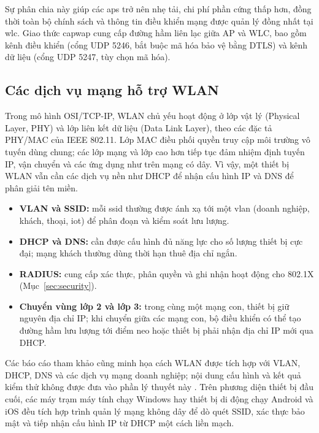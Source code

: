 Sự phân chia này giúp các \acp{ap} trở nên nhẹ tải, chi phí phần cứng thấp hơn, đồng thời toàn bộ chính sách và thông tin điều khiển mạng được quản lý đồng nhất tại \ac{wlc}. Giao thức \ac{capwap} \cite{rfc5415, rfc5416} cung cấp đường hầm liên lạc giữa AP và WLC, bao gồm kênh điều khiển (cổng UDP 5246, bắt buộc mã hóa bảo vệ bằng DTLS) và kênh dữ liệu (cổng UDP 5247, tùy chọn mã hóa).

\subsection{Các dịch vụ mạng hỗ trợ WLAN}

Trong mô hình OSI/TCP-IP, WLAN chủ yếu hoạt động ở lớp vật lý (Physical Layer,
PHY) và lớp liên kết dữ liệu (Data Link Layer), theo các đặc tả PHY/MAC của
IEEE 802.11. Lớp MAC điều phối quyền truy cập môi trường vô tuyến dùng chung;
các lớp mạng và lớp cao hơn tiếp tục đảm nhiệm định tuyến IP, vận chuyển và
các ứng dụng như trên mạng có dây. Vì vậy, một thiết bị WLAN vẫn cần các dịch
vụ nền như DHCP để nhận cấu hình IP và DNS để phân giải tên miền.

\begin{itemize}
  \item \textbf{VLAN và SSID:} mỗi \ac{ssid} thường được ánh xạ tới một
    \ac{vlan} (doanh nghiệp, khách, thoại, \ac{iot}) để phân đoạn và kiểm soát
    lưu lượng.
  \item \textbf{DHCP và DNS:} cần được cấu hình đủ năng lực cho số lượng thiết
    bị cực đại; mạng khách thường dùng thời hạn thuê địa chỉ ngắn.
  \item \textbf{RADIUS:} cung cấp xác thực, phân quyền và ghi nhận hoạt động
    cho 802.1X (Mục~\ref{sec:security}).
  \item \textbf{Chuyển vùng lớp 2 và lớp 3:} trong cùng một mạng con, thiết bị
    giữ nguyên địa chỉ IP; khi chuyển giữa các mạng con, bộ điều khiển có thể
    tạo đường hầm lưu lượng tới điểm neo hoặc thiết bị phải nhận địa chỉ IP mới
    qua DHCP.
\end{itemize}

Các báo cáo tham khảo cũng minh họa cách WLAN được tích hợp với VLAN, DHCP,
DNS và các dịch vụ mạng doanh nghiệp; nội dung cấu hình và kết quả kiểm thử
không được đưa vào phần lý thuyết này \cite{hcmus_office_network}.
Trên phương diện thiết bị đầu cuối, các máy trạm máy tính chạy Windows \cite{microsoft_wifi} hay thiết bị di động chạy Android \cite{google_android_wifi} và iOS \cite{apple_ios_wifi} đều tích hợp trình quản lý mạng không dây để dò quét SSID, xác thực bảo mật và tiếp nhận cấu hình IP từ DHCP một cách liền mạch.

